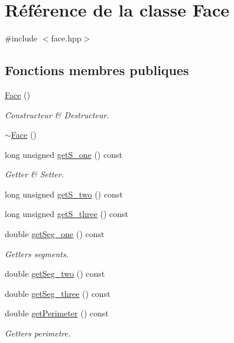 \hypertarget{class_face}{\section{Référence de la classe Face}
\label{class_face}
}


{\ttfamily \#include $<$face.\-hpp$>$}

\subsection*{Fonctions membres publiques}
\begin{DoxyCompactItemize}
\item 
\hyperlink{class_face_afdb634bc2d5287ba0d62e46b57e9dc2e}{Face} ()
\begin{DoxyCompactList}\small\item\em Constructeur \& Destructeur. \end{DoxyCompactList}\item 
\hyperlink{class_face_a182c8c9ba652d46b01fdf6816cd65590}{$\sim$\-Face} ()
\item 
long unsigned \hyperlink{class_face_a6a71144fe15d6edfab4cec3560bdb2aa}{get\-S\-\_\-one} () const 
\begin{DoxyCompactList}\small\item\em Getter \& Setter. \end{DoxyCompactList}\item 
long unsigned \hyperlink{class_face_a5b35ec67e75df789092301fab06a951b}{get\-S\-\_\-two} () const 
\item 
long unsigned \hyperlink{class_face_adddc2b56135f76b623a4ffa9b7c0953f}{get\-S\-\_\-three} () const 
\item 
double \hyperlink{class_face_a906d16f2f1c9adbe881ae46ee7f3e3e9}{get\-Seg\-\_\-one} () const 
\begin{DoxyCompactList}\small\item\em Getters segments. \end{DoxyCompactList}\item 
double \hyperlink{class_face_a50a58b3b43a78239defee57e7202968e}{get\-Seg\-\_\-two} () const 
\item 
double \hyperlink{class_face_a19bb64415987240d90a1ec86d2432f05}{get\-Seg\-\_\-three} () const 
\item 
double \hyperlink{class_face_acd3e36c17c14b6617d92b0b9ecb2b6fc}{get\-Perimeter} () const 
\begin{DoxyCompactList}\small\item\em Getters perimetre. \end{DoxyCompactList}\item 

\end{DoxyCompactItemize}
